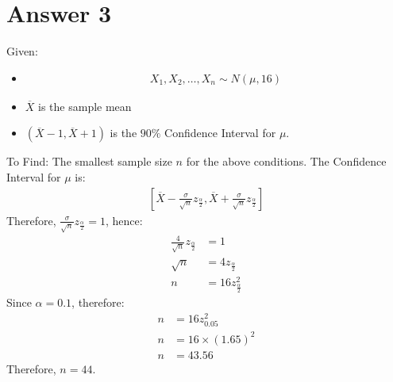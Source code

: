 \documentclass[a4paper]{article}
\begin{document}
\section{Answer 3}
Given:
\begin{itemize}
	\item {
			\begin{equation*}
				\begin{split}
					X_1,X_2,\dots,X_n \sim N\left( \mu,16 \right) 
				\end{split}
			\end{equation*}
		}
	\item{$\overline{X}$ is the sample mean}
	\item{$\left( \overline{X} - 1, \overline{X} + 1 \right) $ is the $90\%$ Confidence Interval for $\mu$.}
\end{itemize}
To Find: The smallest sample size $n$ for the above conditions.
\newline\newline
The Confidence Interval for $\mu$ is:
 \begin{equation*}
	\begin{split}
		\left[ \overline{X} - \frac{\sigma}{\sqrt{n} } z_\frac{\alpha}{2}, \overline{X} + \frac{\sigma}{\sqrt{n} }z_\frac{\alpha}{2} \right] 
	\end{split}
\end{equation*}
Therefore, $\frac{\sigma}{\sqrt{n} }z_\frac{\alpha}{2} = 1$, hence:
\begin{equation*}
	\begin{split}
		\frac{4}{\sqrt{n} }z_\frac{\alpha}{2} &=  1\\
		\sqrt{n} &=  4z_{\frac{\alpha}{2}}\\
		n &= 16z^2_{\frac{\alpha}{2}}
	\end{split}
\end{equation*}
Since $\alpha = 0.1$, therefore:
 \begin{equation*}
	\begin{split}
		n &=  16z^2_{0.05}\\
		n &= 16 \times \left( 1.65 \right) ^2\\
		n &= 43.56
	\end{split}
\end{equation*}
Therefore, $n = 44$.
\newpage
\end{document}

